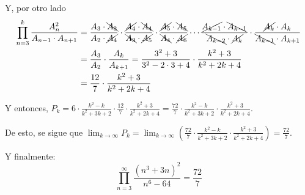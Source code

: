 \documentclass[../../main.tex]{subfiles}
\begin{document}
  Y, por otro lado
  \begin{equation*}
    \begin{split}
      \prod_{n = 3}^k \frac{A_n^2}{A_{n - 1} \cdot A_{n + 1}} & =
      \frac{A_3 \cdot \bcancel{A_3}}{A_2 \cdot \cancel{A_4}} \cdot \frac{\cancel{A_4} \cdot \bcancel{A_4}}{\bcancel{A_3} \cdot\cancel{A_5}} \cdot \frac{\cancel{A_5} \cdot \bcancel{A_5}}{\bcancel{A_4} \cdot \cancel{A_6}} \cdots \frac{\cancel{A_{k - 1}} \cdot \bcancel{A_{k - 1}}}{\bcancel{A_{k - 2}} \cdot \cancel{A_k}} \cdot \frac{\cancel{A_k} \cdot A_k}{\bcancel{A_{k - 1}} \cdot A_{k + 1}} \\ & =
      \frac{A_3}{A_2} \cdot \frac{A_k}{A_{k + 1}} = \frac{3^2 + 3}{3^2 - 2 \cdot 3 + 4} \cdot \frac{k^2 + 3}{k^2 + 2k + 4} \\ & =
      \frac{12}{7} \cdot \frac{k^2 + 3}{k^2 + 2k + 4}
    \end{split}
  \end{equation*}

  Y entonces, $P_k = 6 \cdot \displaystyle\frac{k^2 - k}{k^2 + 3k + 2} \cdot \displaystyle\frac{12}{7} \cdot \displaystyle\frac{k^2 + 3}{k^2 + 2k + 4} = \displaystyle\frac{72}{7} \cdot \displaystyle\frac{k^2 - k}{k^2 + 3k + 2} \cdot \displaystyle\frac{k^2 + 3}{k^2 + 2k + 4}$.

  De esto, se sigue que $\displaystyle\lim_{k \to \infty} P_k = \displaystyle\lim_{k \to \infty} \left(\displaystyle\frac{72}{7} \cdot \displaystyle\frac{k^2 - k}{k^2 + 3k + 2} \cdot \displaystyle\frac{k^2 + 3}{k^2 + 2k + 4}\right) = \displaystyle\frac{72}{7}$.

  Y finalmente:
  $$
  \prod_{n = 3}^\infty \frac{(n^3 + 3n)^2}{n^6 - 64} = \frac{72}{7}
  $$
\end{document}
